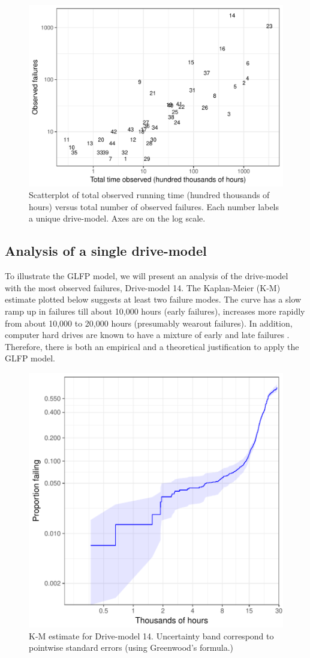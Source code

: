 \documentclass[aoas]{imsart}
\begin{document}
\begin{figure}[H]
  \includegraphics[width=.9\textwidth]{dm-summ-scatter.pdf}
  \caption{Scatterplot of total observed running time (hundred thousands of hours) versus total number of observed failures.  Each number labels a unique drive-model.   Axes are on the log scale.}
  \label{drive-scatter}
\end{figure}

\subsection{Analysis of a single drive-model}
\label{subsec:ex1}
To illustrate the GLFP model, we will present an analysis of the drive-model with the most observed failures, Drive-model 14.  The Kaplan-Meier (K-M) estimate plotted below suggests at least two failure modes.  The curve has a slow ramp up in failures till about 10,000 hours (early failures), increases more rapidly from about 10,000 to 20,000 hours (presumably wearout failures).  In addition, computer hard drives are known to have a mixture of early and late failures \citep{chan}.  Therefore, there is both an empirical and a theoretical justification to apply the GLFP model.

\begin{figure}[H]
\centering
  \includegraphics[width=.6\textwidth]{km14-prob}
  \caption{K-M estimate for Drive-model 14.  Uncertainty band correspond to pointwise standard errors (using Greenwood's formula.)}
  \label{fig1}
\end{figure}
\end{document}
